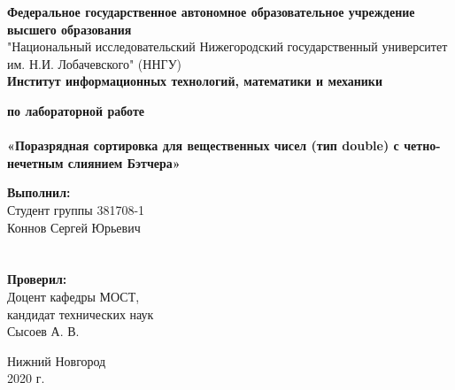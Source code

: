 \documentclass{report}
\begin{document}
    \begin{titlepage}

        \begin{center}
            \textbf{Федеральное государственное автономное образовательное учреждение высшего образования} \\
            "Национальный исследовательский Нижегородский государственный университет им. Н.И. Лобачевского" (ННГУ) \\
            \textbf{Институт информационных технологий, математики и механики}

            \vspace{\fill}

            \textbf{ по лабораторной работе \\}
            \textbf{\large\\ «Поразрядная сортировка для вещественных чисел (тип double) с четно-нечетным слиянием Бэтчера»}

            \vspace{\fill}

            \hfill\parbox{8cm}{
                \hspace*{5cm}\hspace*{-5cm}\textbf{Выполнил:} \\ Студент группы 381708-1 \\ Коннов Сергей Юрьевич \\ \\ \\
                \hspace*{5cm}\hspace*{-5cm}\textbf{Проверил:}\\ Доцент кафедры МОСТ, \\ кандидат технических наук \\ Сысоев А. В.
            }

            \vspace{\fill}

            Нижний Новгород \\ 2020 г.
        \end{center}

    \end{titlepage}

    \setcounter{page}{2}
    \setlength{\cftsecindent}{0em}
    \setlength{\cftsubsecindent}{1.25em}
    \setlength{\cftsubsubsecindent}{2.5em}
    \setlength{\cftsubsubsecnumwidth}{1.25em}
    \tableofcontents
\end{document}
